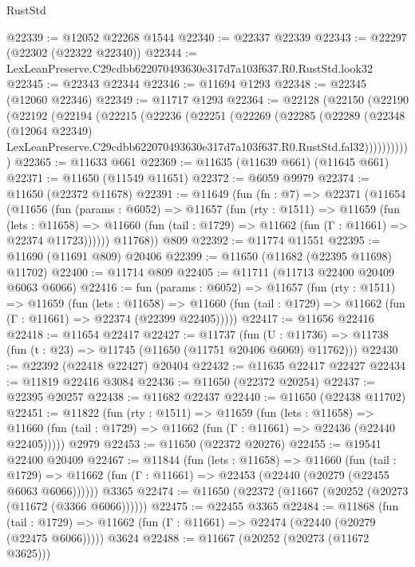 \begin{lexlean}{RustStd}
\begin{coremodule}
@22339 := @12052 @22268 @1544
@22340 := @22337 @22339
@22343 := @22297 (@22302 (@22322 @22340))
@22344 := LexLeanPreserve.C29cdbb622070493630e317d7a103f637.R0.RustStd.look32
@22345 := @22343 @22344
@22346 := @11694 @1293
@22348 := @22345 (@12060 @22346)
@22349 := @11717 @1293
@22364 := @22128
    (@22150
      (@22190
        (@22192
          (@22194
            (@22215
              (@22236
                (@22251
                  (@22269
                    (@22285
                      (@22289
                        (@22348
                          (@12064 @22349)
                          LexLeanPreserve.C29cdbb622070493630e317d7a103f637.R0.RustStd.fal32)))))))))))
@22365 := @11633 @661
@22369 := @11635 (@11639 @661) (@11645 @661)
@22371 := @11650 (@11549 @11651)
@22372 := @6059 @9979
@22374 := @11650 (@22372 @11678)
@22391 := @11649
    (fun (fn : @7) =>
    @22371
      (@11654
        (@11656
          (fun (params : @6052) =>
          @11657
            (fun (rty : @1511) =>
            @11659
              (fun (lets : @11658) =>
              @11660 (fun (tail : @1729) => @11662 (fun (Γ : @11661) => @22374 @11723))))))
        @11768))
    @809
@22392 := @11774 @11551
@22395 := @11690 (@11691 @809) @20406
@22399 := @11650 (@11682 (@22395 @11698) @11702)
@22400 := @11714 @809
@22405 := @11711 (@11713 @22400 @20409 @6063 @6066)
@22416 := fun (params : @6052) =>
  @11657
    (fun (rty : @1511) =>
    @11659
      (fun (lets : @11658) =>
      @11660 (fun (tail : @1729) => @11662 (fun (Γ : @11661) => @22374 (@22399 @22405)))))
@22417 := @11656 @22416
@22418 := @11654 @22417
@22427 := @11737
    (fun (U : @11736) => @11738 (fun (t : @23) => @11745 (@11650 (@11751 @20406 @6069) @11762)))
@22430 := @22392 (@22418 @22427) @20404
@22432 := @11635 @22417 @22427
@22434 := @11819 @22416 @3084
@22436 := @11650 (@22372 @20254)
@22437 := @22395 @20257
@22438 := @11682 @22437
@22440 := @11650 (@22438 @11702)
@22451 := @11822
    (fun (rty : @1511) =>
    @11659
      (fun (lets : @11658) =>
      @11660 (fun (tail : @1729) => @11662 (fun (Γ : @11661) => @22436 (@22440 @22405)))))
    @2979
@22453 := @11650 (@22372 @20276)
@22455 := @19541 @22400 @20409
@22467 := @11844
    (fun (lets : @11658) =>
    @11660
      (fun (tail : @1729) =>
      @11662 (fun (Γ : @11661) => @22453 (@22440 (@20279 (@22455 @6063 @6066))))))
    @3365
@22474 := @11650 (@22372 (@11667 (@20252 (@20273 (@11672 (@3366 @6066))))))
@22475 := @22455 @3365
@22484 := @11868
    (fun (tail : @1729) => @11662 (fun (Γ : @11661) => @22474 (@22440 (@20279 (@22475 @6066)))))
    @3624
@22488 := @11667 (@20252 (@20273 (@11672 @3625)))

\end{coremodule}
\end{lexlean}
